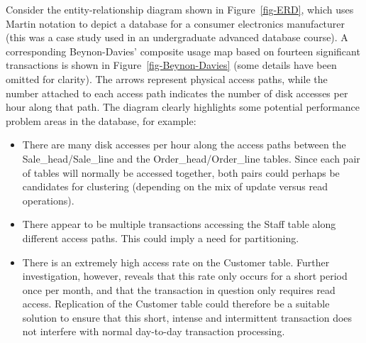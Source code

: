 \documentclass{CRPITStyle}
\begin{document}
Consider the entity-relationship diagram shown in Figure~\ref{fig-ERD},
which uses Martin notation \cite{Mart-J-1990-IE2} to depict a database
for a consumer electronics manufacturer (this was a case study used in
an undergraduate advanced database course). A corresponding
Beynon-Davies' composite usage map based on fourteen significant
transactions \cite{Pill-A-2005-DP} is shown in
Figure~\ref{fig-Beynon-Davies} (some details have been omitted for
clarity). The arrows represent physical access paths, while the number
attached to each access path indicates the number of disk accesses per
hour along that path. The diagram clearly highlights some potential
performance problem areas in the database, for example:
\begin{itemize}

	\item There are many disk accesses per hour along the access paths
	between the \textsf{Sale\_head}/\textsf{Sale\_line} and the
	\textsf{Order\_head}/\textsf{Order\_line} tables. Since each pair of
	tables will normally be accessed together, both pairs could perhaps
	be candidates for clustering (depending on the mix of update versus
	read operations).

	\item There appear to be multiple transactions accessing the
	\textsf{Staff} table along different access paths. This could imply
	a need for partitioning.

	\item There is an extremely high access rate on the
	\textsf{Customer} table. Further investigation, however, reveals
	that this rate only occurs for a short period once per month, and
	that the transaction in question only requires read access.
	Replication of the \textsf{Customer} table could therefore be a
	suitable solution to ensure that this short, intense and
	intermittent transaction does not interfere with normal day-to-day
	transaction processing.
	
\end{itemize}
\end{document}
